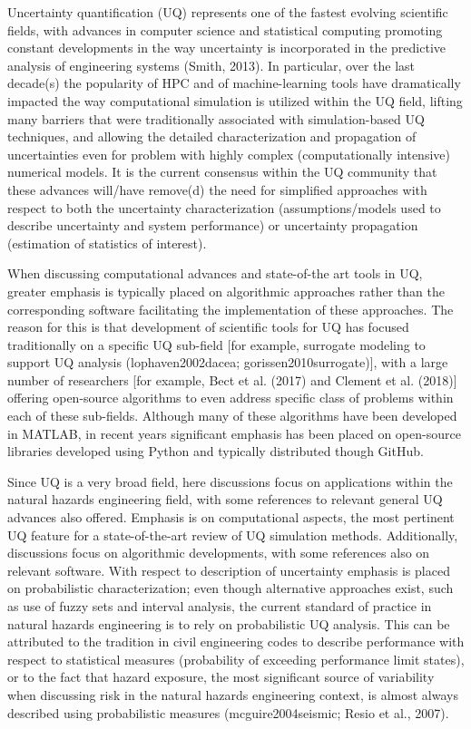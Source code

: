 Uncertainty quantification (UQ) represents one of the fastest evolving scientific fields, with advances in computer science and statistical computing promoting constant developments in the way uncertainty is incorporated in the predictive analysis of engineering systems (Smith, 2013). In particular, over the last decade(s) the popularity of HPC and of machine-learning tools have dramatically impacted the way computational simulation is utilized within the UQ field, lifting many barriers that were traditionally associated with simulation-based UQ techniques, and allowing the detailed characterization and propagation of uncertainties even for problem with highly complex (computationally intensive) numerical models. It is the current consensus within the UQ community that these advances will/have remove(d) the need for simplified approaches with respect to both the uncertainty characterization (assumptions/models used to describe uncertainty and system performance) or uncertainty propagation (estimation of statistics of interest). 

When discussing computational advances and state-of-the art tools in UQ, greater emphasis is typically placed on algorithmic approaches rather than the corresponding software facilitating the implementation of these approaches. The reason for this is that development of scientific tools for UQ has focused traditionally on a specific UQ sub-field [for example, surrogate modeling to support UQ analysis (lophaven2002dacea; gorissen2010surrogate)], with a large number of researchers [for example, Bect et al. (2017) and Clement et al. (2018)] offering open-source algorithms to even address specific class of problems within each of these sub-fields. Although many of these algorithms have been developed in MATLAB, in recent years significant emphasis has been placed on open-source libraries developed using Python and typically distributed though GitHub. 

Since UQ is a very broad field, here discussions focus on applications within the natural hazards engineering field, with some references to relevant general UQ advances also offered. Emphasis is on computational aspects, the most pertinent UQ feature for a state-of-the-art review of UQ simulation methods. Additionally, discussions focus on algorithmic developments, with some references also on relevant software. With respect to description of uncertainty emphasis is placed on probabilistic characterization; even though alternative approaches exist, such as use of fuzzy sets and interval analysis, the current standard of practice in natural hazards engineering is to rely on probabilistic UQ analysis. This can be attributed to the tradition in civil engineering codes to describe performance with respect to statistical measures (probability of exceeding performance limit states), or to the fact that hazard exposure, the most significant source of variability when discussing risk in the natural hazards engineering context, is almost always described using probabilistic measures (mcguire2004seismic; Resio et al., 2007). 

